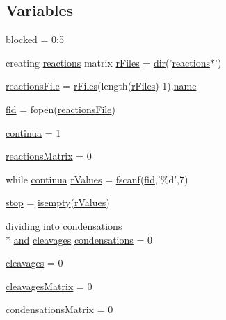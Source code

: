 \subsection*{Variables}
\begin{DoxyCompactItemize}
\item 
\hyperlink{a00030_a1faaaae288fc8ca4ed1751049aa2f84f}{blocked} = 0\+:5
\item 
creating \hyperlink{a00020}{reactions} matrix \hyperlink{a00030_ad75735665492cabd747370126464fddf}{r\+Files} = \hyperlink{a00113_a4ca269cf93df1b512b52174c1a256fe5}{dir}('\hyperlink{a00020}{reactions}$\ast$')
\item 
\hyperlink{a00030_a4c72dba1fe2ee2fbcc699262a8d0c624}{reactions\+File} = \hyperlink{a00030_ad75735665492cabd747370126464fddf}{r\+Files}(length(\hyperlink{a00030_ad75735665492cabd747370126464fddf}{r\+Files})-\/1).\hyperlink{a00027_abbf559a76fab59203496b0847ab9502a}{name}
\item 
\hyperlink{a00030_ae9011d40c6f13e68e6f07156e0da7c5d}{fid} = fopen(\hyperlink{a00030_a4c72dba1fe2ee2fbcc699262a8d0c624}{reactions\+File})
\item 
\hyperlink{a00030_a9c951ebd5bc3f1adce943bee1255f4d6}{continua} = 1
\item 
\hyperlink{a00030_ac52097a2745fcef31eb175d2e9485845}{reactions\+Matrix} = 0
\item 
while \hyperlink{a00030_a9c951ebd5bc3f1adce943bee1255f4d6}{continua} \hyperlink{a00030_a436a6968124e560649654a4abbd9dac6}{r\+Values} = \hyperlink{a00025_a028ac102a731e62fb0a7439381f566c1}{fscanf}(\hyperlink{a00031_ae9011d40c6f13e68e6f07156e0da7c5d}{fid},'\%d',7)
\item 
\hyperlink{a00030_a6bd08e37edf4151f5f6d1fc27a6f227a}{stop} = \hyperlink{a00025_ac10445404f4b83302522defb59e25ef7}{isempty}(\hyperlink{a00030_a436a6968124e560649654a4abbd9dac6}{r\+Values})
\item 
dividing into condensations \\*
\hyperlink{a00028_a170f8acb213f91bf71c77b1d20bceb33}{and} \hyperlink{a00030_a89060c6979e5a4ff7b0985b35f295695}{cleavages} \hyperlink{a00030_ad3aa27d88a7e9d77d8334155860269bb}{condensations} = 0
\item 
\hyperlink{a00030_a89060c6979e5a4ff7b0985b35f295695}{cleavages} = 0
\item 
\hyperlink{a00030_a1a691fb4f955887edfa538e91479fafe}{cleavages\+Matrix} = 0
\item 
\hyperlink{a00030_afaba8eef2f8f4e4dda2e893a19e55a94}{condensations\+Matrix} = 0
\item 

\end{DoxyCompactItemize}
